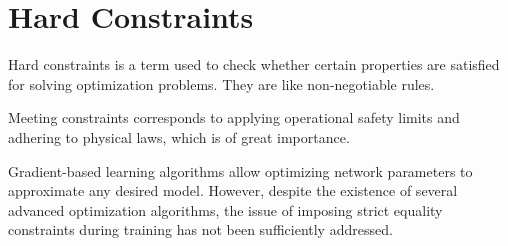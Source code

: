 \section{Hard Constraints}

\begin{comment}
    
Hard constraints é um termo utilizado para verificar se certas propriedades são satisfeitas para resolução de problemas de otimização.\cite{rfc16} São como regras não negociáveis.

A satisfação das restrições corresponde à aplicação dos limites de segurança operacional e à adesão às leis físicas, sendo de suma importância\cite{rfc15}.

Algoritmos de aprendizado baseados em gradiente permitem otimizar os parâmetros de redes para aproximar qualquer modelo desejado. No entanto, apesar da existência de vários algoritmos avançados de otimização, a questão de impor restrições estritas de igualdade durante o treinamento não foi suficientemente abordada\cite{rfc10}.

Aplicar solucionadores tradicionais para otimização geral restrita, como SQP\cite{rfc18}, a redes neurais pode ser não trivial. Como os métodos tradicionais expressam restrições como uma função de parâmetros aprendíveis, essa formulação se torna extremamente dimensional, não linear e não convexa no contexto de redes neurais\cite{rfc10}.

Em operações de sistemas de abastecimento de água é restringida por requisitos mínimos de pressão; limitações de capacidade impostas por bombas, dutos e tanques; e um conjunto de restriçõies hidráulicas. As restrições hidráulicas que dão origem a complexas formulações mistas inteiras e não lineares. A primeira classe de métodos impõe restrições de pressão e capacidade explicitamente, enquanto as restrições hidráulicas são inlcuídas implicitamente por meio de ferramentas de simulação de rede de água, como o EPANET. \cite{rfc17}

\end{comment}

Hard constraints is a term used to check whether certain properties are satisfied for solving optimization problems.\cite{rfc16} They are like non-negotiable rules.

Meeting constraints corresponds to applying operational safety limits and adhering to physical laws, which is of great importance.\cite{rfc15}

Gradient-based learning algorithms allow optimizing network parameters to approximate any desired model. However, despite the existence of several advanced optimization algorithms, the issue of imposing strict equality constraints during training has not been sufficiently addressed.\cite{rfc10}

